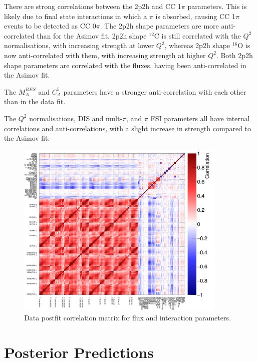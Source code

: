 There are strong correlations between the 2p2h and CC 1$\pi$ parameters. This is likely due to final state interactions in which a $\pi$ is absorbed, causing CC 1$\pi$ events to be detected as CC 0$\pi$. The 2p2h shape parameters are more anti-correlated than for the Asimov fit. 2p2h shape $^{12}$C is still correlated with the $Q^2$ normalisations, with increasing strength at lower $Q^2$, whereas 2p2h shape $^{16}$O is now anti-correlated with them, with increasing strength at higher $Q^2$. Both 2p2h shape parameters are correlated with the fluxes, having been anti-correlated in the Asimov fit.

The $M_{A}^{RES}$ and $C_{A}^5$ parameters have a stronger anti-correlation with each other than in the data fit.

The $Q^2$ normalisations, DIS and mult-$\pi$, and $\pi$ FSI parameters all have internal correlations and anti-correlations, with a slight increase in strength compared to the Asimov fit. 

\begin{figure}
\centering
\includegraphics*[width=0.9\textwidth,clip]{figs/MaCh3DataCorr}
\caption{Data postfit correlation matrix for flux and interaction parameters.}\label{fig:datpostfitcov}
\end{figure}

\section{Posterior Predictions}\label{sec:respostpred}

